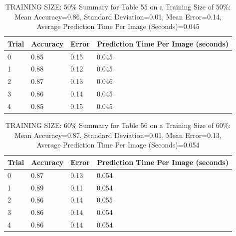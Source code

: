 \documentclass{article}
\begin{document}
\begin{table}[H]

\centering
{\begin{tabular}{||p{1cm}|p{1.8cm}|p{1.8cm}|p{3cm}||}
 \hline
Trial & Accuracy & Error & Prediction Time Per Image (seconds) \\ [0.5ex] 
 \hline\hline
   0  & 0.85  & 0.15  & 0.045\\
\hline
   1  & 0.88  & 0.12  & 0.045\\
\hline
   2  & 0.87  & 0.13  & 0.046\\
\hline
   3  & 0.86  & 0.14  & 0.045\\
\hline
   4  & 0.85  & 0.15  & 0.045\\
\hline

\end{tabular}}
\caption{TRAINING SIZE: 50\% \newline Summary for Table 55 on a Training Size of 50\%: Mean Accuracy=0.86, Standard Deviation=0.01, Mean Error=0.14, Average Prediction Time Per Image (Seconds)=0.045}
\end{table} 

\begin{table}[H]

\centering
{\begin{tabular}{||p{1cm}|p{1.8cm}|p{1.8cm}|p{3cm}||}
 \hline
Trial & Accuracy & Error & Prediction Time Per Image (seconds) \\ [0.5ex] 
 \hline\hline
   0  & 0.87  & 0.13  & 0.054\\
\hline
   1  & 0.89  & 0.11  & 0.054\\
\hline
   2  & 0.86  & 0.14  & 0.055\\
\hline
   3  & 0.86  & 0.14  & 0.054\\
\hline
   4  & 0.86  & 0.14  & 0.054\\
\hline


\end{tabular}}
\caption{TRAINING SIZE: 60\% \newline Summary for Table 56 on a Training Size of 60\%: Mean Accuracy=0.87, Standard Deviation=0.01, Mean Error=0.13, Average Prediction Time Per Image (Seconds)=0.054}
\end{table} 
\end{document}
